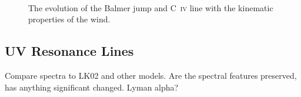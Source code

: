 \documentclass[preprint, a4paper, 11pt]{aastex}
\begin{document}
\begin{figure} %
\mbox{
\quad
{}   
}
\caption{The evolution of the Balmer jump and C~\textsc{iv} line with the kinematic properties
of the wind. 
}
\label{jump}
\end{figure}



\subsection{UV Resonance Lines}
Compare spectra to LK02 and other models. Are the spectral features preserved, has anything significant changed.
Lyman alpha?



\end{document}
